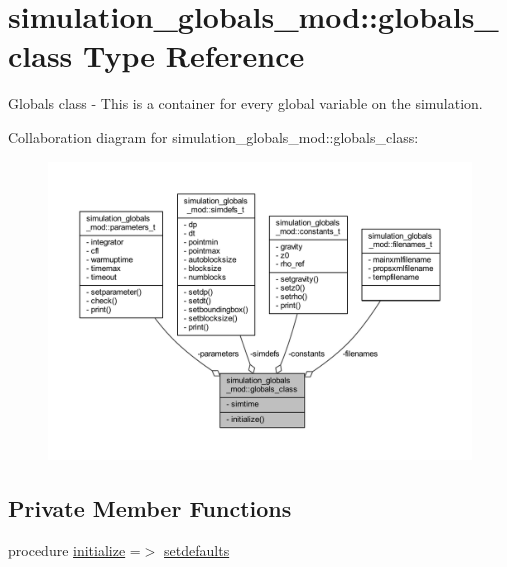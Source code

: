 \hypertarget{structsimulation__globals__mod_1_1globals__class}{}\section{simulation\+\_\+globals\+\_\+mod\+:\+:globals\+\_\+class Type Reference}
\label{structsimulation__globals__mod_1_1globals__class}


Globals class -\/ This is a container for every global variable on the simulation.  




Collaboration diagram for simulation\+\_\+globals\+\_\+mod\+:\+:globals\+\_\+class\+:\nopagebreak
\begin{figure}[H]
\begin{center}
\leavevmode
\includegraphics[width=350pt]{structsimulation__globals__mod_1_1globals__class__coll__graph}
\end{center}
\end{figure}
\subsection*{Private Member Functions}
\begin{DoxyCompactItemize}
\item 
procedure \mbox{\hyperlink{structsimulation__globals__mod_1_1globals__class_a9438f8bdec469e7cbf9b898a398f9745}{initialize}} =$>$ \mbox{\hyperlink{namespacesimulation__globals__mod_ac2ac06271de377004c67b6ba2f3ed353}{setdefaults}}
\end{DoxyCompactItemize}

